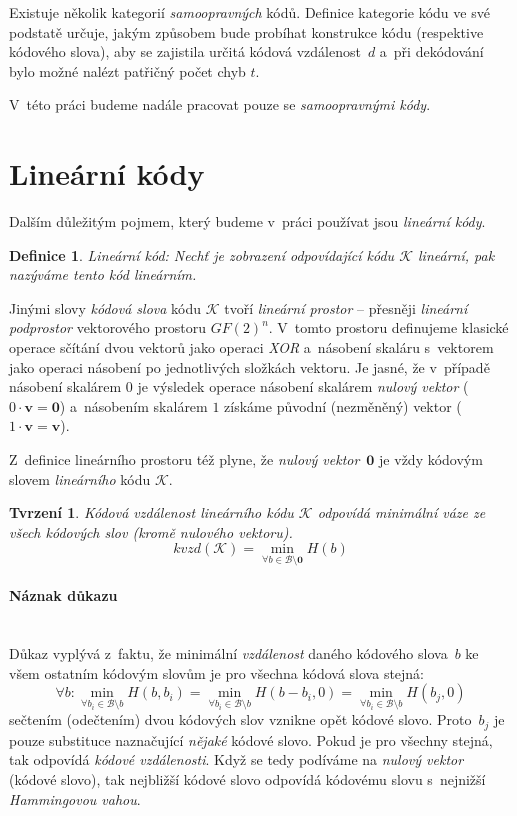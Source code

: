 \documentclass[thesis=M,czech,hidelinks]{FITthesis}[2012/06/26]
\newcommand{\0}{{\textcolor[gray]{0.75}{0}}}
\newtheorem{tvrzeni}{Tvrzení}
\newtheorem{definice}{Definice}
\begin{document}
Existuje několik kategorií \emph{samoopravných} kódů. Definice kategorie kódu ve
své podstatě určuje, jakým způsobem bude probíhat konstrukce kódu (respektive
kódového slova), aby se zajistila určitá kódová vzdálenost~$d$ a~při dekódování
bylo možné nalézt patřičný počet chyb $t$.

V~této práci budeme nadále pracovat pouze se \emph{samoopravnými kódy}.



\section{Lineární kódy}\label{kap_linearni_kody}
Dalším důležitým pojmem, který budeme v~práci používat jsou \emph{lineární
kódy}.

\begin{definice}{Lineární kód:}
    Nechť je zobrazení odpovídající kódu $\mathcal{K}$ \emph{lineární},
    pak nazýváme tento kód \emph{lineárním}.
\end{definice}

Jinými slovy \emph{kódová slova} kódu $\mathcal{K}$ tvoří \emph{lineární
prostor} -- přesněji \emph{lineární podprostor} vektorového prostoru $GF(2)^n$.
V~tomto prostoru definujeme klasické operace sčítání dvou vektorů jako operaci
\emph{XOR} a~násobení skaláru s~vektorem jako operaci násobení po jednotlivých
složkách vektoru. Je jasné, že v~případě násobení skalárem $0$ je výsledek
operace násobení skalárem \emph{nulový vektor} ($0 \cdot \mathbf{v} = \mathbf{0}$)
a~násobením skalárem $1$ získáme původní (nezměněný) vektor
($1 \cdot \mathbf{v} = \mathbf{v}$).

Z~definice lineárního prostoru též plyne, že \emph{nulový vektor}~$\mathbf{0}$
je vždy kódovým slovem \emph{lineárního} kódu $\mathcal{K}$.

\begin{tvrzeni}
    Kódová vzdálenost lineárního kódu $\mathcal{K}$ odpovídá minimální váze ze
    všech kódových slov (kromě nulového vektoru).
    $$
        kvzd(\mathcal{K}) =
        \min_{\forall b \in \mathcal{B} \setminus \mathbf{0}} H(b)
    $$
\end{tvrzeni}
\paragraph{Náznak důkazu} \hfil \\
Důkaz vyplývá z~faktu, že minimální \emph{vzdálenost} daného kódového slova~$b$
ke všem ostatním kódovým slovům je pro všechna kódová slova stejná:
$$
    \forall b :
    \min_{\forall b_i \in \mathcal{B} \setminus b} H( b,     b_i ) =
    \min_{\forall b_i \in \mathcal{B} \setminus b} H( b-b_i, 0   ) =
    \min_{\forall b_i \in \mathcal{B} \setminus b} H( b_j,   0   )
$$
sečtením (odečtením) dvou kódových slov vznikne opět kódové slovo. Proto~$b_j$
je pouze substituce naznačující \emph{nějaké} kódové slovo. Pokud je pro všechny
stejná, tak odpovídá \emph{kódové vzdálenosti}. Když se tedy podíváme na
\emph{nulový vektor} (kódové slovo), tak nejbližší kódové slovo odpovídá
kódovému slovu s~nejnižší \emph{Hammingovou vahou}.
\end{document}
